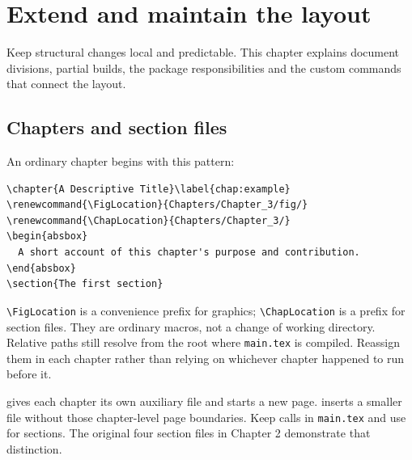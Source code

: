 
\chapter{Extend and maintain the layout}\label{chap:07}
\renewcommand{\FigLocation}{Chapters/Chapter_7/fig/}
\renewcommand{\ChapLocation}{Chapters/Chapter_7/}
\begin{absbox}
Keep structural changes local and predictable. This chapter explains document divisions, partial builds, the package responsibilities and the custom commands that connect the layout.
\end{absbox}

\section{Chapters and section files}
An ordinary chapter begins with this pattern:
\begin{lstlisting}
\chapter{A Descriptive Title}\label{chap:example}
\renewcommand{\FigLocation}{Chapters/Chapter_3/fig/}
\renewcommand{\ChapLocation}{Chapters/Chapter_3/}
\begin{absbox}
  A short account of this chapter's purpose and contribution.
\end{absbox}
\section{The first section}
\end{lstlisting}
\verb|\FigLocation| is a convenience prefix for graphics;
\verb|\ChapLocation| is a prefix for section files. They are ordinary macros,
not a change of working directory. Relative paths still resolve from the root
where \texttt{main.tex} is compiled. Reassign them in each chapter rather than
relying on whichever chapter happened to run before it.

\verb|| gives each chapter its own auxiliary file and starts a new page.
\verb|| inserts a smaller file without those chapter-level page boundaries.
Keep \verb|| calls in \texttt{main.tex} and use \verb|| for sections.
The original four section files in Chapter 2 demonstrate that distinction.

